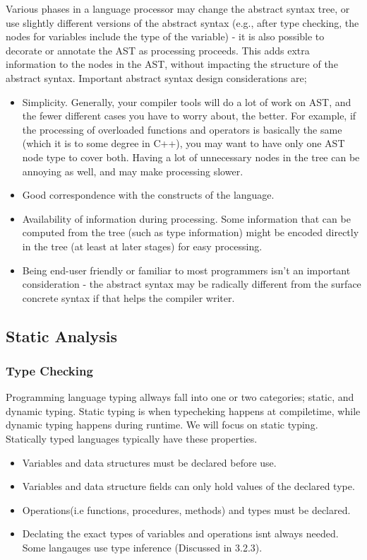 \documentclass{article}
\begin{document}
        Various phases in a language processor may change the abstract syntax
        tree, or use slightly different versions of the abstract syntax (e.g., after type
        checking, the nodes for variables include the type of the variable) - it is also
        possible to decorate or annotate the AST as processing proceeds. 
        This adds extra information to the nodes in the AST, without impacting the structure of the abstract syntax.
        Important abstract syntax design considerations are;
        \begin{itemize}
            \item Simplicity. Generally, your compiler tools will do a lot of work on AST,
            and the fewer different cases you have to worry about, the better. For
            example, if the processing of overloaded functions and operators is basically the same (which it is to some degree in C++), you may want to have
            only one AST node type to cover both. Having a lot of unnecessary nodes
            in the tree can be annoying as well, and may make processing slower.
            \item Good correspondence with the constructs of the language.
            \item Availability of information during processing. Some information that
            can be computed from the tree (such as type information) might be encoded directly in the tree (at least at later stages) for easy processing.
            \item Being end-user friendly or familiar to most programmers isn't an important consideration - the abstract syntax may be radically different from
            the surface concrete syntax if that helps the compiler writer.

        \end{itemize}
        \subsection{Static Analysis}
            \subsubsection{Type Checking}
            Programming language typing allways fall into one or two categories; static, and dynamic typing. Static typing is when typecheking happens at compiletime, 
            while dynamic typing happens during runtime. We will focus on static typing. 
            Statically typed languages typically have these properties.
            \begin{itemize}
                \item Variables and data structures must be declared before use.
                \item Variables and data structure fields can only hold values of the declared type.
                \item Operations(i.e functions, procedures, methods) and types must be declared.
                \item Declating the exact types of variables and operations isnt always needed. Some langauges use type inference (Discussed in 3.2.3).
            \end{itemize}
\end{document}
